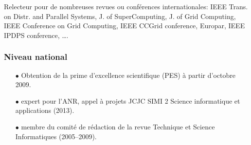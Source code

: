\documentclass[11pt]{article}
\begin{document}
Relecteur pour de nombreuses revues ou conférences internationales: IEEE Trans. on Distr. and Parallel Systems, 
J. of SuperComputing, J. of Grid Computing, IEEE Conference on Grid Computing, IEEE CCGrid conference, Europar,
IEEE IPDPS conference, \ldots.


\subsubsection{Niveau national}
\begin{itemize}


\item[$\bullet$] Obtention de la prime d'excellence scientifique (PES) à partir d'octobre 2009.\\

\item [$\bullet$]
expert pour l'ANR, appel à projets JCJC SIMI 2 Science informatique et applications (2013).\\

\item [$\bullet$]
membre du comité de rédaction de la revue Technique et Science Informatiques (2005--2009).\\
\end{itemize}
\end{document}
